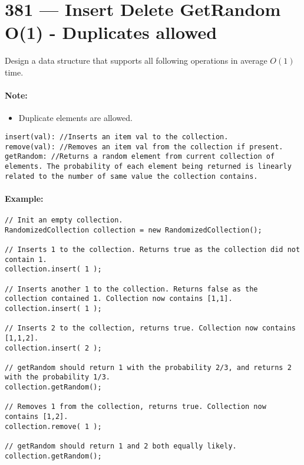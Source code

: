 \section{381 --- Insert Delete GetRandom O(1) - Duplicates allowed}
Design a data structure that supports all following operations in average $ O(1) $ time.

\paragraph{Note:} 
\begin{itemize}
\item Duplicate elements are allowed.
\end{itemize}


\begin{lstlisting}[style=customc]
insert(val): //Inserts an item val to the collection.
remove(val): //Removes an item val from the collection if present.
getRandom: //Returns a random element from current collection of elements. The probability of each element being returned is linearly related to the number of same value the collection contains.
\end{lstlisting}

\paragraph{Example:}

\begin{lstlisting}[style=customc]
// Init an empty collection.
RandomizedCollection collection = new RandomizedCollection();

// Inserts 1 to the collection. Returns true as the collection did not contain 1.
collection.insert( 1 );

// Inserts another 1 to the collection. Returns false as the collection contained 1. Collection now contains [1,1].
collection.insert( 1 );

// Inserts 2 to the collection, returns true. Collection now contains [1,1,2].
collection.insert( 2 );

// getRandom should return 1 with the probability 2/3, and returns 2 with the probability 1/3.
collection.getRandom();

// Removes 1 from the collection, returns true. Collection now contains [1,2].
collection.remove( 1 );

// getRandom should return 1 and 2 both equally likely.
collection.getRandom();
\end{lstlisting}

